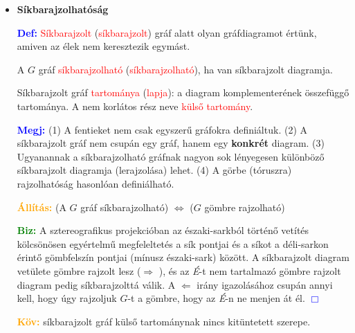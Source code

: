 \documentclass[../../szobeli.tex]{subfiles}
\begin{document}
\begin{center}
    \noindent{}
\end{center}

    \begin{itemize}
        \item \textbf{Síkbarajzolhatóság}

        \textcolor{blue}{\textbf{Def:}} \textcolor{red}{Síkbarajzolt} (\textcolor{red}{síkbarajzolt}) gráf alatt olyan gráfdiagramot értünk, amiven az  élek nem keresztezik egymást.

        A $G$ gráf \textcolor{red}{síkbarajzolható} (\textcolor{red}{síkbarajzolható}), ha van síkbarajzolt diagramja. 

        Síkbarajzolt gráf \textcolor{red}{tartománya} (\textcolor{red}{lapja}): a diagram komplementerének összefüggő tartománya. A nem korlátos rész neve \textcolor{red}{külső tartomány}. 

        \textcolor{blue}{\textbf{Megj:}} (1) A fentieket nem csak egyszerű gráfokra definiáltuk. (2) A síkbarajzolt gráf nem csupán egy gráf, hanem egy \textbf{konkrét} diagram. (3) Ugyanannak a síkbarajzolható gráfnak nagyon sok lényegesen különböző síkbarajzolt diagramja (lerajzolása) lehet. (4) A görbe (tóruszra) rajzolhatóság hasonlóan definiálható.

        \textcolor{orange}{\textbf{Állítás:}} (A $G$ gráf síkbarajzolható) $\Longleftrightarrow$ ($G$ gömbre rajzolható) 

        \textcolor{green}{\textbf{Biz:}} A sztereografikus projekcióban az északi-sarkból történő vetítés kölcsönösen egyértelmű megfeleltetés a sík pontjai és a síkot a déli-sarkon érintő gömbfelszín pontjai (mínusz északi-sark) között. A síkbarajzolt diagram vetülete gömbre rajzolt lesz ($\Rightarrow$ \checkmark), és az \textit{É}-t nem tartalmazó gömbre rajzolt diagram pedig síkbarajzolttá válik. A $\Leftarrow$ irány igazolásához csupán annyi kell, hogy úgy rajzoljuk $G$-t a gömbre, hogy az \textit{É}-n ne menjen át él. \textcolor{blue}{$\Box$}

        \textcolor{orange}{\textbf{Köv:}} síkbarajzolt gráf külső tartománynak nincs kitüntetett szerepe.


\end{itemize}
\end{document}

